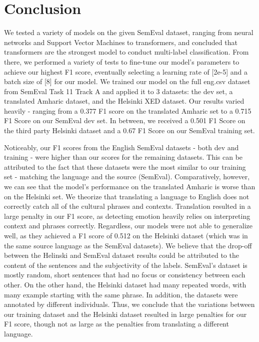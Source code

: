 \documentclass[11pt]{article}
\begin{document}
\section*{Conclusion}
We tested a variety of models on the given SemEval dataset, ranging from neural networks and Support Vector Machines to transformers, and concluded that transformers are the strongest model to conduct multi-label classification. From there, we performed a variety of tests to fine-tune our model’s parameters to achieve our highest F1 score, eventually selecting a learning rate of [2e-5] and a batch size of [8] for our model. We trained our model on the full eng.csv dataset from SemEval Task 11 Track A and applied it to 3 datasets: the dev set, a translated Amharic dataset, and the Helsinki XED dataset. Our results varied heavily - ranging from a 0.377 F1 score on the translated Amharic set to a 0.715 F1 Score on our SemEval dev set. In between, we received a 0.501 F1 Score on the third party Helsinki dataset and a 0.67 F1 Score on our SemEval training set.

Noticeably, our F1 scores from the English SemEval datasets - both dev and training - were higher than our scores for the remaining datasets. This can be attributed to the fact that these datasets were the most similar to our training set - matching the language and the source (SemEval). Comparatively, however, we can see that the model’s performance on the translated Amharic is worse than on the Helsinki set. We theorize that translating a language to English does not correctly catch all of the cultural phrases and contexts. Translation resulted in a large penalty in our F1 score, as detecting emotion heavily relies on interpreting context and phrases correctly. Regardless, our models were not able to generalize well, as they achieved a F1 score of 0.512 on the Helsinki dataset (which was in the same source language as the SemEval datasets). We believe that the drop-off between the Helinski and SemEval dataset results could be attributed to the content of the sentences and the subjectivity of the labels. SemEval’s dataset is mostly random, short sentences that had no focus or consistency between each other. On the other hand, the Helsinki dataset had many repeated words, with many example starting with the same phrase. In addition, the datasets were annotated by different individuals. Thus, we conclude that the variations between our training dataset and the Helsinki dataset resulted in large penalties for our F1 score, though not as large as the penalties from translating a different language.
\end{document}
